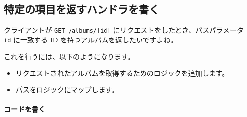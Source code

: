 
\subsection{特定の項目を返すハンドラを書く}

クライアントが \texttt{GET\ /albums/{[}id{]}}
にリクエストをしたとき、パスパラメータ \texttt{id} に一致する ID
を持つアルバムを返したいですよね。

これを行うには、以下のようになります。

\begin{itemize}

\item
  リクエストされたアルバムを取得するためのロジックを追加します。
\item
  パスをロジックにマップします。
\end{itemize}

\paragraph{コードを書く}

